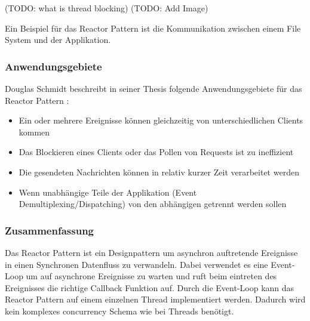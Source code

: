(TODO: what is thread blocking)
(TODO: Add Image)

Ein Beispiel für das Reactor Pattern ist die Kommunikation zwischen einem File System und der Applikation.


\subsubsection{Anwendungsgebiete}

Douglas Schmidt beschreibt in seiner Thesis folgende Anwendungsgebiete für das Reactor Pattern \cite[p. 4]{Sch95}:

\begin{itemize}
  \item Ein oder mehrere Ereignisse können gleichzeitig von unterschiedlichen Clients kommen
  \item Das Blockieren eines Clients oder das Pollen von Requests ist zu ineffizient
  \item Die gesendeten Nachrichten können in relativ kurzer Zeit verarbeitet werden
  \item Wenn unabhängige Teile der Applikation (Event Demultiplexing/Dispatching) von den abhängigen getrennt werden sollen
\end{itemize}

\subsubsection{Zusammenfassung}

Das Reactor Pattern ist ein Designpattern um asynchron auftretende Ereignisse in einen Synchronen Datenfluss zu verwandeln. Dabei verwendet es eine Event-Loop um auf asynchrone Ereignisse zu warten und ruft beim eintreten des Ereignisses die richtige Callback Funktion auf. Durch die Event-Loop kann das Reactor Pattern auf einem einzelnen Thread implementiert werden. Dadurch wird kein komplexes concurrency Schema wie bei Threads benötigt.